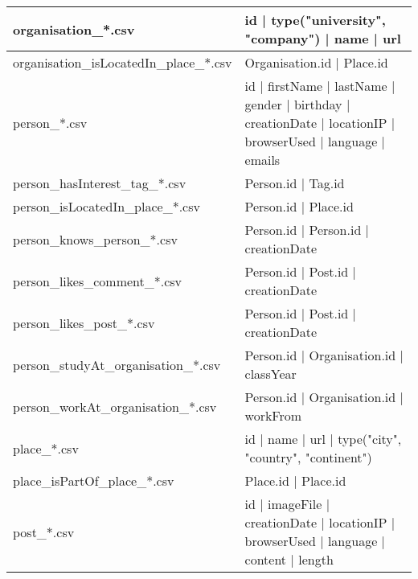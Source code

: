 \begin{table}[htb]
\begin{tabular}{|p{4.6cm}|p{11.4cm}|}
    	organisation\_*.csv                      & id | type({"university", "company"}) | name | url                                                           \\ \hline
    	organisation\_isLocatedIn\_place\_*.csv  & Organisation.id | Place.id                                                                                  \\ \hline
    	person\_*.csv                            & id | firstName | lastName | gender | birthday | creationDate | locationIP | browserUsed | language | emails \\ \hline
    	person\_hasInterest\_tag\_*.csv          & Person.id | Tag.id                                                                                          \\ \hline
    	person\_isLocatedIn\_place\_*.csv        & Person.id | Place.id                                                                                        \\ \hline
    	person\_knows\_person\_*.csv             & Person.id | Person.id | creationDate                                                                        \\ \hline
    	person\_likes\_comment\_*.csv            & Person.id | Post.id | creationDate                                                                          \\ \hline
    	person\_likes\_post\_*.csv               & Person.id | Post.id | creationDate                                                                          \\ \hline
    	person\_studyAt\_organisation\_*.csv     & Person.id | Organisation.id | classYear                                                                     \\ \hline
    	person\_workAt\_organisation\_*.csv      & Person.id | Organisation.id | workFrom                                                                      \\ \hline
    	place\_*.csv                             & id | name | url | type({"city", "country", "continent"})                                                    \\ \hline
    	place\_isPartOf\_place\_*.csv            & Place.id | Place.id                                                                                         \\ \hline
    	post\_*.csv                              & id | imageFile | creationDate | locationIP | browserUsed | language | content | length                      \\ \hline

\end{tabular}
\end{table}
